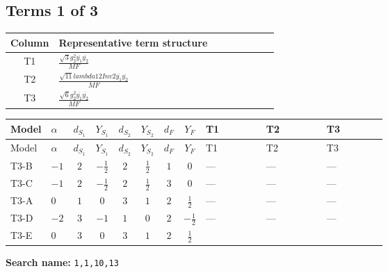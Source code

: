 \documentclass[8pt]{article}
\begin{document}
\begin{landscape}
\subsection*{Terms 1 of 3}
\begin{center}
\begin{tabular}{@{}c >{\raggedright\arraybackslash}p{0.82\linewidth}@{}}
\toprule
Column & Representative term structure \\
\midrule
T1 & \(\displaystyle \frac{\sqrt{3} g_{2}^{2} \overline{y_{1}} \overline{y_{2}}}{MF}\) \\
\midrule
T2 & \(\displaystyle \frac{\sqrt{11} lambda12Inv2 \overline{y_{1}} \overline{y_{2}}}{MF}\) \\
\midrule
T3 & \(\displaystyle \frac{\sqrt{6} g_{2}^{2} \overline{y_{1}} \overline{y_{2}}}{MF}\) \\
\midrule
\bottomrule
\end{tabular}
\end{center}
\smallskip
\tiny
\begin{longtable}{@{}llcccccc >{\raggedright\arraybackslash}p{0.21\linewidth} >{\raggedright\arraybackslash}p{0.21\linewidth} >{\raggedright\arraybackslash}p{0.21\linewidth}@{}}
\toprule
Model & $\alpha$ & $d_{S_1}$ & $Y_{S_1}$ & $d_{S_2}$ & $Y_{S_2}$ & $d_F$ & $Y_F$ & T1 & T2 & T3 \\
\midrule
\endfirsthead
\toprule
Model & $\alpha$ & $d_{S_1}$ & $Y_{S_1}$ & $d_{S_2}$ & $Y_{S_2}$ & $d_F$ & $Y_F$ & T1 & T2 & T3 \\
\midrule
\endhead
T3-B & $-1$ & $2$ & $-\frac{1}{2}$ & $2$ & $\frac{1}{2}$ & $1$ & $0$ & --- & --- & --- \\
\midrule
T3-C & $-1$ & $2$ & $-\frac{1}{2}$ & $2$ & $\frac{1}{2}$ & $3$ & $0$ & --- & --- & --- \\
\midrule
T3-A & $0$ & $1$ & $0$ & $3$ & $1$ & $2$ & $\frac{1}{2}$ & --- & --- & --- \\
\midrule
T3-D & $-2$ & $3$ & $-1$ & $1$ & $0$ & $2$ & $-\frac{1}{2}$ & --- & --- & --- \\
\midrule
T3-E & $0$ & $3$ & $0$ & $3$ & $1$ & $2$ & $\frac{1}{2}$ & \scriptsize\adjustbox{max width=\linewidth}{$\begin{gathered} - \frac{49 \sqrt{3} g_{2}^{2} \overline{y_{1}} \overline{y_{2}}}{24 MF}\end{gathered}$} & \scriptsize\adjustbox{max width=\linewidth}{$\begin{gathered} - \frac{3 \sqrt{11} lambda12Inv2 \overline{y_{1}} \overline{y_{2}}}{22 MF}\end{gathered}$} & \scriptsize\adjustbox{max width=\linewidth}{$\begin{gathered} - \frac{\sqrt{6} g_{2}^{2} \overline{y_{1}} \overline{y_{2}}}{3 MF}\end{gathered}$} \\
\midrule
\bottomrule
\end{longtable}
\clearpage
\noindent\textbf{Search name: }\texttt{1,1,10,13}\par\smallskip

\end{landscape}
\end{document}
